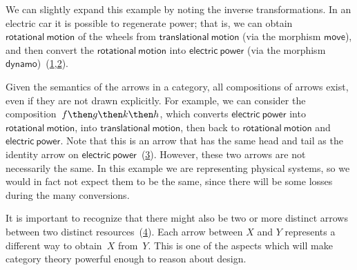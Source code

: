 We can slightly expand this example by noting the inverse transformations. In an electric car
it is possible to regenerate power; that is, we can obtain $\mathsf{rotational}\ \mathsf{motion}$ of the wheels from
$\mathsf{translational}\ \mathsf{motion}$ (via the morphism $\mathsf{move}$), and then convert the $\mathsf{rotational}\ \mathsf{motion}$ into $\mathsf{electric}\ \mathsf{power}$ (via the morphism $\mathsf{dynamo}$)~(\cref{fig:e6},\cref{fig:e6-together}).


\begin{figure}[h!]
    \centering
    \caption{\label{fig:e6}}
\end{figure}


\begin{figure}[h!]
    \centering
    \caption{\label{fig:e6-together}}
\end{figure}

Given the semantics of the arrows in a category, all compositions of arrows exist, even if they are not drawn
explicitly. For example, we can consider the composition~$f\then g \then k \then h$, which
converts $\mathsf{electric}\ \mathsf{power}$ into $\mathsf{rotational}\ \mathsf{motion}$, into $\mathsf{translational}\ \mathsf{motion}$, then back to
$\mathsf{rotational}\ \mathsf{motion}$ and $\mathsf{electric}\ \mathsf{power}$. Note that this is an arrow that has the same head and tail as the identity arrow on $\mathsf{electric}\ \mathsf{power}$~(\cref{fig:e8}). However, these two arrows are not necessarily the same. In this example we are representing physical systems, so we would in fact not expect them to be the same, since there will be some losses during the many conversions.

\begin{figure}[h!]
    \centering
    \caption{\label{fig:e8}}
\end{figure}

It is important to recognize that there might also be two or more distinct arrows between two distinct resources~(\cref{fig:e9}). Each arrow between $X$ and $Y$ represents a different way  to obtain~$X$ from~$Y$. This is one of the aspects which will make category theory powerful enough to reason about design.

\begin{figure}[h!]
    \centering
    \caption{\label{fig:e9}}
\end{figure}

